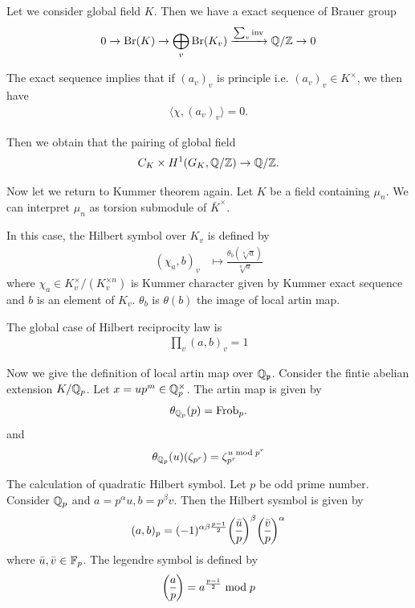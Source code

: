 {\begin{theorem}
    Let we consider global field $K$. Then we have a exact sequence of Brauer group 
    \begin{align*}
        0\to \operatorname{Br}(K) \to \bigoplus_{v}\operatorname{Br}(K_v) \xrightarrow{\sum_v \text{inv}} \mathbb{Q}/\mathbb{Z} \to 0
    \end{align*}
\end{theorem}

The exact sequence implies that if $(a_v)_v$ is principle i.e. $(a_v)_v \in K^\times$, we then have 
\begin{align*}
    \langle \chi,(a_v)_v \rangle =0.
\end{align*}

Then we obtain that the pairing of global field
\begin{align*}
    C_K \times H^1(G_K,\mathbb{Q}/\mathbb{Z}) \to \mathbb{Q}/\mathbb{Z}. 
\end{align*}





Now let we return to Kummer theorem again. Let $K$ be a field containing $\mu_n$. We can interpret 
$\mu_n$ as torsion submodule of $\bar{K}^\times$.



In this case, the Hilbert symbol over $K_v$ is defined by 
\begin{align*}
    (\chi_a,b)_v &\mapsto \frac{\theta_b(\sqrt[n]{a})}{\sqrt[n]{a}}
\end{align*}
where $\chi_a\in K_v^\times/(K_v^{\times n})$ is Kummer character given by Kummer exact sequence
and $b$ is an element of $K_v$. $\theta_b$ is $\theta(b)$ the image of local artin map.

The global case of Hilbert reciprocity law is 
\begin{align*}
    \prod_v(a,b)_v = 1
\end{align*}

Now we give the definition of local artin map over $\mathbb{Q}_{\mathfrak{p}}$. Consider the fintie abelian extension $K/\mathbb{Q}_p$. Let $x=up^m\in\mathbb{Q}_p^\times$.
The artin map is given by
\begin{align*}
    \theta_{\mathbb{Q}_p}(p) = \text{Frob}_p.
\end{align*}
and 
\begin{align*}
    \theta_{\mathbb{Q}_p}(u)(\zeta_{p^r}) = \zeta_{p^r}^{u \bmod p^r}
\end{align*}


The calculation of quadratic Hilbert symbol. 
Let $p$ be odd prime number.
Consider $\mathbb{Q}_p$ and $a=p^\alpha u, b = p^\beta v$. Then the Hilbert sysmbol is given by 
\begin{align*}
    (a,b)_p = (-1)^{\alpha\beta\frac{p-1}{2}} \legendre{\bar{u}}{p}^\beta \legendre{\bar{v}}{p}^\alpha 
\end{align*}
where $\bar{u},\bar{v}\in \mathbb{F}_p$.
The legendre symbol is defined by 
\begin{align*}
    \legendre{a}{p} = a^{\frac{p-1}{2}}\bmod p
\end{align*}

}
